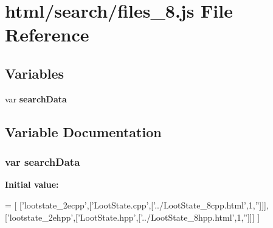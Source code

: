 \section{html/search/files\-\_\-8.js File Reference}
\label{files__8_8js}
\subsection*{Variables}
\begin{DoxyCompactItemize}
\item 
var {\bf search\-Data}
\end{DoxyCompactItemize}


\subsection{Variable Documentation}
\subsubsection[{search\-Data}]{\setlength{\rightskip}{0pt plus 5cm}var search\-Data}\label{files__8_8js_ad01a7523f103d6242ef9b0451861231e}
{\bfseries Initial value\-:}
\begin{DoxyCode}
=
[
  [\textcolor{stringliteral}{'lootstate\_2ecpp'},[\textcolor{stringliteral}{'LootState.cpp'},[\textcolor{stringliteral}{'../LootState\_8cpp.html'},1,\textcolor{stringliteral}{''}]]],
  [\textcolor{stringliteral}{'lootstate\_2ehpp'},[\textcolor{stringliteral}{'LootState.hpp'},[\textcolor{stringliteral}{'../LootState\_8hpp.html'},1,\textcolor{stringliteral}{''}]]]
]
\end{DoxyCode}
